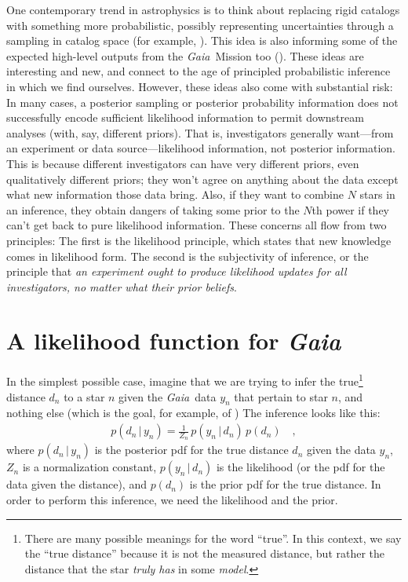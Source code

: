 \documentclass[12pt, modern]{aastex62h}
\newcommand{\Gaia}{\textsl{Gaia}}
\newcommand{\given}{\,|\,}
\begin{document}
One contemporary trend in astrophysics is to think about replacing rigid
catalogs with something more probabilistic, possibly representing uncertainties
through a sampling in catalog space (for example, \citealt{brewer, portillo}).
This idea is also informing some of the expected high-level outputs from
the \Gaia\ Mission too (\citealt{apsis}).
These ideas are interesting and new, and connect to the age of principled
probabilistic inference in which we find ourselves.
However, these ideas also come with substantial risk:
In many cases, a posterior sampling or posterior probability information
does not successfully encode sufficient likelihood information to permit
downstream analyses (with, say, different priors).
That is, investigators generally want---from an experiment or data source---likelihood
information, not posterior information.
This is because different investigators can have very different priors,
even qualitatively different priors; they won't agree on anything about the
data except what new information those data bring.
Also, if they want to combine $N$ stars in an inference, they obtain dangers
of taking some prior to the $N$th power if they can't get back to pure
likelihood information.
These concerns all flow from two principles: The first is the likelihood principle,
which states that new knowledge comes in likelihood form.
The second is the subjectivity of inference, or the principle that
\emph{an experiment ought to produce likelihood updates for all investigators,
no matter what their prior beliefs}.

\section{A likelihood function for \textsl{Gaia}}
In the simplest possible case, imagine that we are trying to infer
the true\footnote{There are many possible meanings for the word ``true''.
  In this context, we say the ``true distance'' because it is not the measured
  distance, but rather the distance that the star \emph{truly has} in some \emph{model}.}
distance $d_n$ to a star $n$ given the \Gaia\ data $y_n$ that
pertain to star $n$, and nothing else
(which is the goal, for example, of \citealt{tri2})
The inference looks like this:
\begin{eqnarray}
p(d_n\given y_n) = \frac{1}{Z_n}\,p(y_n\given d_n)\,p(d_n)
\label{eq:inference}
\quad ,
\end{eqnarray}
where
$p(d_n\given y_n)$ is the posterior pdf for the true distance $d_n$ given the data $y_n$,
$Z_n$ is a normalization constant,
$p(y_n\given d_n)$ is the likelihood (or the pdf for the data given the distance),
and $p(d_n)$ is the prior pdf for the true distance.
In order to perform this inference, we need the likelihood and the prior.
\end{document}
